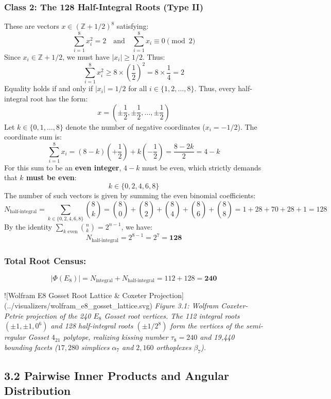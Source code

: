 \documentclass[11pt,twoside,openright]{amsbook}
\begin{document}
\subsubsection{Class 2: The 128 Half-Integral Roots (Type II)}
These are vectors $x \in (\mathbb{Z} + 1/2)^8$ satisfying:
$$\sum_{i=1}^8 x_i^2 = 2 \quad \text{and} \quad \sum_{i=1}^8 x_i \equiv 0 \pmod 2$$
Since $x_i \in \mathbb{Z} + 1/2$, we must have $|x_i| \ge 1/2$. Thus:
$$\sum_{i=1}^8 x_i^2 \ge 8 \times \left(\frac{1}{2}\right)^2 = 8 \times \frac{1}{4} = 2$$
Equality holds if and only if $|x_i| = 1/2$ for all $i \in \{1, 2, \dots, 8\}$.
Thus, every half-integral root has the form:
$$x = \left( \pm \frac{1}{2}, \pm \frac{1}{2}, \dots, \pm \frac{1}{2} \right)$$
Let $k \in \{0, 1, \dots, 8\}$ denote the number of negative coordinates ($x_i = -1/2$). The coordinate sum is:
$$\sum_{i=1}^8 x_i = (8 - k)\left(+\frac{1}{2}\right) + k\left(-\frac{1}{2}\right) = \frac{8 - 2k}{2} = 4 - k$$
For this sum to be an \textbf{even integer}, $4 - k$ must be even, which strictly demands that \textbf{$k$ must be even}:
$$k \in \{0, 2, 4, 6, 8\}$$
The number of such vectors is given by summing the even binomial coefficients:
$$N_{\text{half-integral}} = \sum_{k \in \{0, 2, 4, 6, 8\}} \binom{8}{k} = \binom{8}{0} + \binom{8}{2} + \binom{8}{4} + \binom{8}{6} + \binom{8}{8} = 1 + 28 + 70 + 28 + 1 = 128$$
By the identity $\sum_{k \text{ even}} \binom{n}{k} = 2^{n-1}$, we have:
$$N_{\text{half-integral}} = 2^{8 - 1} = 2^7 = \mathbf{128}$$

\subsubsection{Total Root Census:}
$$|\Phi(E_8)| = N_{\text{integral}} + N_{\text{half-integral}} = 112 + 128 = \mathbf{240}$$

![Wolfram E8 Gosset Root Lattice & Coxeter Projection](../visualizers/wolfram_e8_gosset_lattice.svg)
\textit{Figure 3.1: Wolfram Coxeter-Petrie projection of the 240 $E_8$ Gosset root vertices. The 112 integral roots $(\pm 1, \pm 1, 0^6)$ and 128 half-integral roots $(\pm 1/2^8)$ form the vertices of the semi-regular Gosset $4_{21}$ polytope, realizing kissing number $\tau_8 = 240$ and 19,440 bounding facets ($17,280$ simplices $\alpha_7$ and $2,160$ orthoplexes $\beta_7$).}


\subsection{3.2 Pairwise Inner Products and Angular Distribution}
\end{document}
